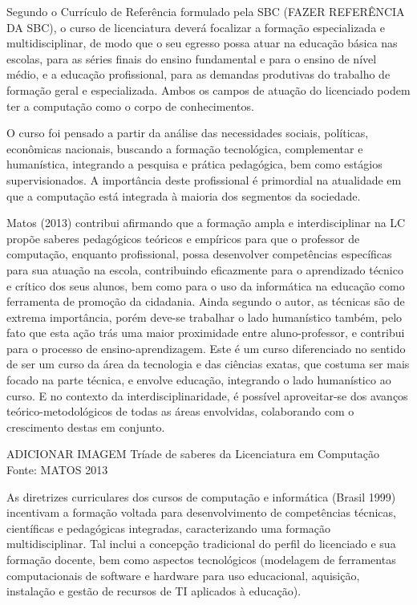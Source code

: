 Segundo o Currículo de Referência formulado pela SBC (FAZER REFERÊNCIA DA SBC), o curso de licenciatura deverá focalizar a formação especializada e multidisciplinar, de modo que o seu egresso possa atuar na educação básica nas escolas, para as séries finais do ensino fundamental e para o ensino de nível médio, e a educação profissional, para as demandas produtivas do trabalho de formação geral e especializada. Ambos os campos de atuação do licenciado podem ter a computação como o corpo de conhecimentos.

O curso foi pensado a partir da análise das necessidades sociais, políticas, econômicas nacionais, buscando a formação tecnológica, complementar e humanística, integrando a pesquisa e prática pedagógica, bem como estágios supervisionados. A importância deste profissional é primordial na atualidade em que a computação está integrada à maioria dos segmentos da sociedade. 

Matos (2013) contribui afirmando que a formação ampla e interdisciplinar na LC propõe saberes pedagógicos teóricos e empíricos para que o professor de computação, enquanto profissional, possa desenvolver competências específicas para sua atuação na escola, contribuindo eficazmente para o aprendizado técnico e crítico dos seus alunos, bem como para o uso da informática na educação como ferramenta de promoção da cidadania. Ainda segundo o autor, as técnicas são de extrema importância, porém deve-se trabalhar o lado humanístico também, pelo fato que esta ação trás uma maior proximidade entre aluno-professor, e contribui para o processo de ensino-aprendizagem. Este é um curso diferenciado no sentido de ser um curso da área da tecnologia e das ciências exatas, que costuma ser mais focado na parte técnica, e envolve educação, integrando o lado humanístico ao curso. E no contexto da interdisciplinaridade, é possível aproveitar-se dos avanços teórico-metodológicos de todas as áreas envolvidas, colaborando com o crescimento destas em conjunto.


			ADICIONAR IMAGEM 
			Tríade de saberes da Licenciatura em Computação
			Fonte: MATOS 2013
 
As diretrizes curriculares dos cursos de computação e informática (Brasil 1999) incentivam a formação voltada para desenvolvimento de competências técnicas, científicas e pedagógicas integradas, caracterizando uma formação multidisciplinar. Tal inclui a concepção tradicional do perfil do licenciado e sua formação docente, bem como aspectos tecnológicos (modelagem de ferramentas computacionais de software e hardware para uso educacional, aquisição, instalação e gestão de recursos de TI aplicados à educação).

